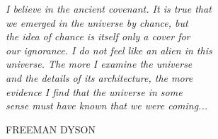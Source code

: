 \thispagestyle{empty}
\null\vfill
\begin{dedication}
\settowidth{}
\centering
\parbox{\longest}{%
  \raggedright{\large\itshape%
   I believe in the ancient covenant. It is true that\\
   we emerged in the universe by chance, but\\
   the idea of chance is itself only a cover for\\
   our ignorance. I do not feel like an alien in this\\
   universe. The more I examine the universe\\
   and the details of its architecture, the more\\
   evidence I find that the universe in some\\
   sense must have known that we were coming...	\par\bigskip
  }   
  \raggedleft\Large\MakeUppercase{\textup{Freeman Dyson}}\par%
}
\end{dedication}

\vfill\vfill

\clearpage